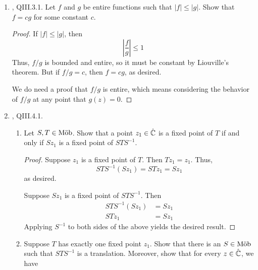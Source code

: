 \documentclass[../psets.tex]{subfiles}
\begin{document}
\begin{enumerate}[ref={A.\arabic*}]
\begin{enumerate}
\begin{proof}
\begin{equation*}
            \end{equation*}
            Then
            \begin{equation*}
                g^*(z) = \frac{-\tfrac{1}{z^2}+\tfrac{1}{z}-1}{\tfrac{1}{z^4}-\tfrac{1}{z^3}-\tfrac{1}{z}+1}
                = \frac{-z^2+z^3-z^4}{1-z-z^3+z^4}
                = z^2\cdot\frac{-1+z-z^2}{1-z-z^3+z^4}
            \end{equation*}
            Thus $w_0$ has multiplicity 
        \end{proof}
    \end{enumerate}
    \item \textcite{bib:FischerLieb}, QIII.3.1. Let $f$ and $g$ be entire functions such that $|f|\leq|g|$. Show that $f=cg$ for some constant $c$.
    \begin{proof}
        If $|f|\leq|g|$, then
        \begin{equation*}
            \left| \frac{f}{g} \right| \leq 1
        \end{equation*}
        Thus, $f/g$ is bounded and entire, so it must be constant by Liouville's theorem. But if $f/g=c$, then $f=cg$, as desired.\par
        We do need a proof that $f/g$ is entire, which means considering the behavior of $f/g$ at any point that $g(z)=0$.
    \end{proof}
    \item \textcite{bib:FischerLieb}, QIII.4.1.
    \begin{enumerate}
        \item Let $S,T\in\operatorname{M\ddot{o}b}$. Show that a point $z_1\in\hat{\mathbb{C}}$ is a fixed point of $T$ if and only if $Sz_1$ is a fixed point of $STS^{-1}$.
        \begin{proof}
            Suppose $z_1$ is a fixed point of $T$. Then $Tz_1=z_1$. Thus,
            \begin{equation*}
                STS^{-1}(Sz_1) = STz_1 = Sz_1
            \end{equation*}
            as desired.\par
            Suppose $Sz_1$ is a fixed point of $STS^{-1}$. Then
            \begin{align*}
                STS^{-1}(Sz_1) &= Sz_1\\
                STz_1 &= Sz_1
            \end{align*}
            Applying $S^{-1}$ to both sides of the above yields the desired result.
        \end{proof}
        \item Suppose $T$ has exactly one fixed point $z_1$. Show that there is an $S\in\operatorname{M\ddot{o}b}$ such that $STS^{-1}$ is a translation. Moreover, show that for every $z\in\hat{\mathbb{C}}$, we have

\end{enumerate}
\end{enumerate}
\end{document}
